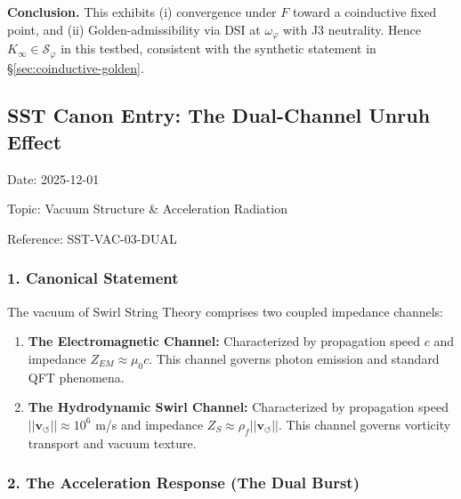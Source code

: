             \medskip
            \noindent
            \textbf{Conclusion.}
            This exhibits (i) convergence under \(F\) toward a coinductive fixed point, and
            (ii) Golden-admissibility via DSI at \(\omega_\varphi\) with J3 neutrality.
            Hence \(K_\infty\in\mathcal S_\varphi\) in this testbed, consistent with the
            synthetic statement in \S\ref{sec:coinductive-golden}.



        \subsection*{\textbf{SST Canon Entry: The Dual-Channel Unruh Effect}}


            Date: 2025-12-01

            Topic: Vacuum Structure & Acceleration Radiation

            Reference: SST-VAC-03-DUAL



            \subsubsection*{\textbf{1. Canonical Statement}}


                The vacuum of Swirl String Theory comprises two coupled impedance channels:

                \begin{enumerate}
                        \item \textbf{The Electromagnetic Channel:} Characterized by propagation speed $c$ and impedance $Z_{EM} \approx \mu_0 c$. This channel governs photon emission and standard QFT phenomena.


                        \item \textbf{The Hydrodynamic Swirl Channel:} Characterized by propagation speed $||\mathbf{v}_{\circlearrowleft}|| \approx 10^6$ m/s and impedance $Z_S \approx \rho_{\!f} ||\mathbf{v}_{\circlearrowleft}||$. This channel governs vorticity transport and vacuum texture.


                \end{enumerate}


            \subsubsection*{\textbf{2. The Acceleration Response (The Dual Burst)}}


